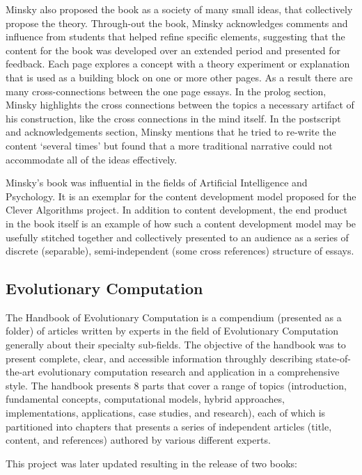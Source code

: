 \documentclass[a4paper, 11pt]{article}
\begin{document}
Minsky also proposed the book as a society of many small ideas, that collectively propose the theory. Through-out the book, Minsky acknowledges comments and influence from students that helped refine specific elements, suggesting that the content for the book was developed over an extended period and presented for feedback. Each page explores a concept with a theory experiment or explanation that is used as a building block on one or more other pages. As a result there are many cross-connections between the one page essays. In the prolog section, Minsky highlights the cross connections between the topics a necessary artifact of his construction, like the cross connections in the mind itself. In the postscript and acknowledgements section, Minsky mentions that he tried to re-write the content `several times' but found that a more traditional narrative could not accommodate all of the ideas effectively. 

Minsky's book was influential in the fields of Artificial Intelligence and Psychology. It is an exemplar for the content development model proposed for the Clever Algorithms project. In addition to content development, the end product in the book itself is an example of how such a content development model may be usefully stitched together and collectively presented to an audience as a series of discrete (separable), semi-independent (some cross references) structure of essays. 

% 
% 
\subsection{Evolutionary Computation}
\label{subsec:ec}
The Handbook of Evolutionary Computation \cite{Baeck1997} is a compendium (presented as a folder) of articles written by experts in the field of Evolutionary Computation generally about their specialty sub-fields. The objective of the handbook was to present complete, clear, and accessible information throughly describing state-of-the-art evolutionary computation research and application in a comprehensive style. The handbook presents 8 parts that cover a range of topics (introduction, fundamental concepts, computational models, hybrid approaches, implementations, applications, case studies, and research), each of which is partitioned into chapters that presents a series of independent articles (title, content, and references) authored by various different experts.

This project was later updated resulting in the release of two books:
\end{document}
